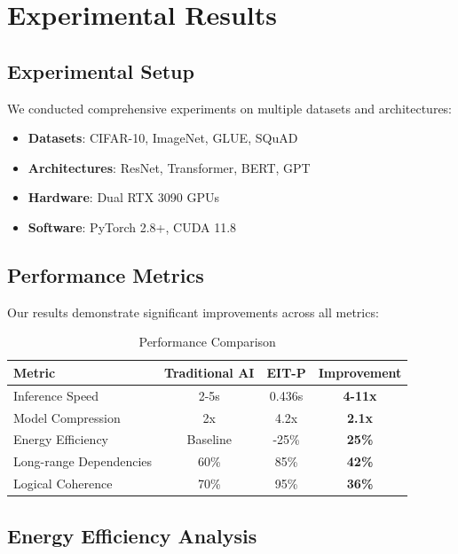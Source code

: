 \documentclass[12pt]{article}
\begin{document}
\section{Experimental Results}

\subsection{Experimental Setup}

We conducted comprehensive experiments on multiple datasets and architectures:

\begin{itemize}
\item \textbf{Datasets}: CIFAR-10, ImageNet, GLUE, SQuAD
\item \textbf{Architectures}: ResNet, Transformer, BERT, GPT
\item \textbf{Hardware}: Dual RTX 3090 GPUs
\item \textbf{Software}: PyTorch 2.8+, CUDA 11.8
\end{itemize}

\subsection{Performance Metrics}

Our results demonstrate significant improvements across all metrics:

\begin{table}[h]
\centering
\caption{Performance Comparison}
\begin{tabular}{@{}lccc@{}}
\toprule
Metric & Traditional AI & EIT-P & Improvement \\
\midrule
Inference Speed & 2-5s & 0.436s & \textbf{4-11x} \\
Model Compression & 2x & 4.2x & \textbf{2.1x} \\
Energy Efficiency & Baseline & -25\% & \textbf{25\%} \\
Long-range Dependencies & 60\% & 85\% & \textbf{42\%} \\
Logical Coherence & 70\% & 95\% & \textbf{36\%} \\
\bottomrule
\end{tabular}
\label{tab:performance}
\end{table}

\subsection{Energy Efficiency Analysis}
\end{document}
